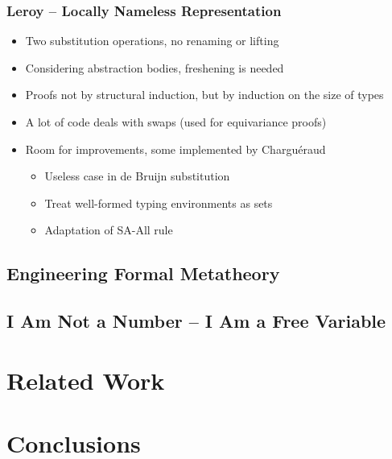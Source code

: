 \documentclass[notheorems]{beamer}
\begin{document}
\begin{frame}

  \frametitle{Leroy -- Locally Nameless Representation}

  \begin{itemize}
   \item Two substitution operations, no renaming or lifting
   \item Considering abstraction bodies, freshening is needed
   \item Proofs not by structural induction, but by induction on the size of types
   \item A lot of code deals with swaps (used for equivariance proofs)
   \item Room for improvements, some implemented by Chargu\'eraud
     \begin{itemize}
       \item Useless case in de Bruijn substitution
       \item Treat well-formed typing environments as sets
       \item Adaptation of SA-All rule
     \end{itemize}
  \end{itemize}

\end{frame}


\subsection{Engineering Formal Metatheory}


\subsection{I Am Not a Number -- I Am a Free Variable}


\section{Related Work}




\section{Conclusions}


\end{document}

